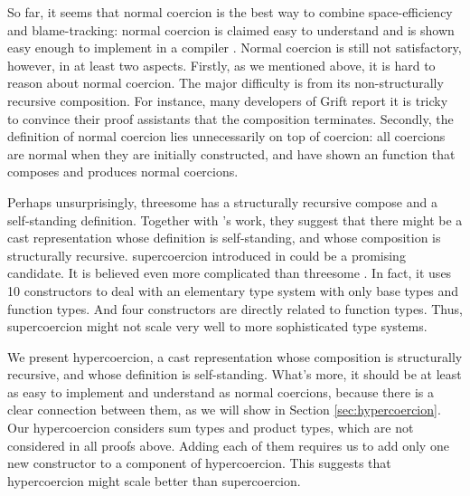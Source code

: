 \documentclass[acmsmall,review,anonymous]{acmart}\settopmatter{printfolios=true,printccs=false,printacmref=false}
\begin{document}
So far, it seems that normal coercion is the best way to combine 
space-efficiency and blame-tracking: normal coercion is claimed easy to 
understand \cite{garcia2013calculating}\cite{siek2015blame} and is shown 
easy enough to implement in a compiler \cite{kuhlenschmidt2018efficient}.
Normal coercion is still not satisfactory, however, in at least two aspects.
Firstly, as we mentioned above, it is hard to reason about normal coercion. The 
major difficulty is from its non-structurally recursive composition.
For instance, many developers of Grift report it is tricky to convince
their proof assistants that the composition terminates.
%
%
Secondly, the definition of normal coercion lies unnecessarily on top 
of coercion: all coercions are normal when they are initially constructed, and 
\citet{siek2012interpretations} have shown an function that 
composes and produces normal coercions.
%

Perhaps unsurprisingly, threesome has a structurally recursive compose and a 
self-standing definition. Together with \citet{garcia2013calculating}'s 
work, they suggest that there might be a cast representation whose definition 
is self-standing, and whose composition is structurally recursive. 
supercoercion introduced in \citet{garcia2013calculating} could be a promising 
candidate. It is believed even more complicated than threesome 
\cite{siek2015blame}. In fact, it uses 10 constructors to deal with an 
elementary type system with only base types and 
function types. And four constructors are directly related to function types. 
Thus, supercoercion might not scale very well to more sophisticated type 
systems. 

We present hypercoercion, a cast representation whose composition is 
structurally recursive, and whose definition is self-standing. What's more, it 
should be at 
least as easy to implement and understand as normal coercions, because there is 
a clear connection between them, as we will show in Section 
\ref{sec:hypercoercion}.
Our hypercoercion considers sum types and product types, which are not 
considered in all proofs above. Adding each of them requires us to add only one 
new constructor to a component of hypercoercion. This suggests that 
hypercoercion might scale better than supercoercion.
\end{document}
